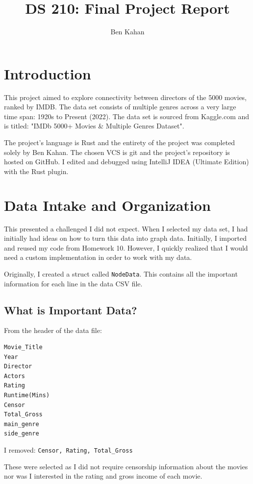 \documentclass[12pt,letterpaper]{article}
\author{Ben Kahan}
\title{DS 210: Final Project Report}
\begin{document}
\maketitle

\pagebreak

\section{Introduction}

This project aimed to explore connectivity between directors of the 5000 movies,  ranked by IMDB.  The data set consists of multiple genres across a very large time span: 1920s to Present (2022).  The data set is sourced from Kaggle.com and is titled: "IMDb 5000+ Movies \& Multiple Genres Dataset".  

The project's language is Rust and the entirety of the project was completed solely by Ben Kahan.  The chosen VCS is git and the project's repository is hosted on GitHub.  I edited and debugged using IntelliJ IDEA (Ultimate Edition) with the Rust plugin. 

\section{Data Intake and Organization}

This presented a challenged I did not expect.  When I selected my data set, I had initially had ideas on how to turn this data into graph data.  Initially, I imported and reused my code from Homework 10. However,  I quickly realized that I would need a custom implementation in order to work with my data.  

Originally, I created a struct called \texttt{NodeData}.  This contains all the important information for each line in the data CSV file. 

\subsection{What is Important Data?}

From the header of the data file:

\begin{verbatim}
Movie_Title
Year
Director
Actors
Rating
Runtime(Mins)
Censor
Total_Gross
main_genre
side_genre

\end{verbatim}
I removed: \texttt{Censor, Rating, Total\_Gross}

These were selected as I did not require censorship information about the movies nor was I interested in the rating and gross income of each movie. 
\end{document}
